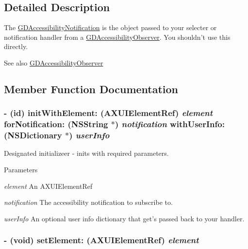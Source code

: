 \subsection{Detailed Description}
The \hyperlink{interface_g_d_accessibility_notification}{GDAccessibilityNotification} is the object passed to your selecter or notification handler from a \hyperlink{interface_g_d_accessibility_observer}{GDAccessibilityObserver}. You shouldn't use this directly.

\begin{DoxySeeAlso}{See also}
\hyperlink{interface_g_d_accessibility_observer}{GDAccessibilityObserver} 
\end{DoxySeeAlso}


\subsection{Member Function Documentation}
\hypertarget{interface_g_d_accessibility_notification_a79fa1997f1e26f0f63f4b2e16ec4a7b8}{
\subsubsection[{initWithElement:forNotification:withUserInfo:}]{\setlength{\rightskip}{0pt plus 5cm}-\/ (id) initWithElement: (AXUIElementRef) {\em element}\/ forNotification: ({\bf NSString} $\ast$) {\em notification}\/ withUserInfo: (NSDictionary $\ast$) {\em userInfo}}}
\label{interface_g_d_accessibility_notification_a79fa1997f1e26f0f63f4b2e16ec4a7b8}


Designated initializeer -\/ inits with required parameters. 
\begin{DoxyParams}{Parameters}
\item[{\em element}]An AXUIElementRef \item[{\em notification}]The accessibility notification to subscribe to. \item[{\em userInfo}]An optional user info dictionary that get's passed back to your handler. \end{DoxyParams}
\hypertarget{interface_g_d_accessibility_notification_a2dcdd48bb0572d48810026fed1577b9c}{
\subsubsection[{setElement:}]{\setlength{\rightskip}{0pt plus 5cm}-\/ (void) setElement: (AXUIElementRef) {\em element}}}
\label{interface_g_d_accessibility_notification_a2dcdd48bb0572d48810026fed1577b9c}


